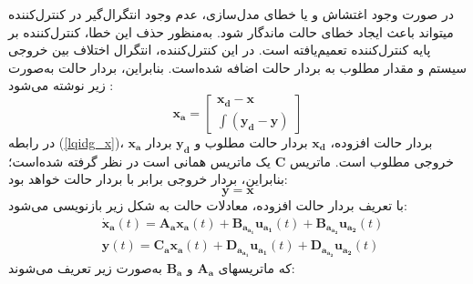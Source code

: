 در صورت وجود اغتشاش و یا خطای مدل‌سازی، عدم وجود انتگرال‌گیر در کنترل‌کننده
 میتواند باعث ایجاد خطای حالت ماندگار شود. به‌منظور حذف این خطا، کنترل‌کننده
 بر پایه کنترل‌کننده
 تعمیم‌یافته است. در این کنترل‌کننده، انتگرال اختلاف بین خروجی سیستم و مقدار مطلوب به بردار حالت اضافه شده‌است. بنابراین، بردار حالت به‌صورت زیر نوشته می‌شود
 \cite{reza_pordal}:
 \begin{equation}\label{lqidg_x}
 	\boldsymbol{x_a} = \begin{bmatrix}
 		\boldsymbol{x_d} - \boldsymbol{x}\\
 		\displaystyle \int (\boldsymbol{y_d} - \boldsymbol{y})
 	\end{bmatrix}
 \end{equation}
در رابطه
(\ref{lqidg_x})،
$	\boldsymbol{x_a}$
بردار حالت افزوده،
$	\boldsymbol{x_d}$
بردار حالت مطلوب و
$	\boldsymbol{y_d}$
  بردار خروجی مطلوب است. ماتریس
  $	\boldsymbol{C}$
 یک ماتریس همانی است در نظر گرفته شده‌است؛ بنابراین، بردار خروجی برابر با بردار حالت خواهد
بود:
\begin{equation}
	\boldsymbol{y} = \boldsymbol{x}
\end{equation}
با تعریف بردار حالت افزوده، معادلات حالت به شكل زیر بازنویسی می‌شود:
 \begin{equation}\label{systemlqidg}
	\begin{split}
		&\boldsymbol{\dot x_a}(t) = \boldsymbol{A_ax_a}(t) + \boldsymbol{B_{a_{a_1}}u_{a_1}}(t) + \boldsymbol{B_{a_{a_2}}u_{a_2}}(t)%
		\\
		&\boldsymbol{y}(t) = \boldsymbol{C_ax_a}(t) + \boldsymbol{D_{a_{a_1}}u_{a_1}}(t) + \boldsymbol{D_{a_{a_2}}u_{a_2}}(t)
	\end{split}
\end{equation}
که ماتریسهای $\boldsymbol{A_a}$ و $\boldsymbol{B_a}$ به‌صورت زیر تعریف می‌شوند:


